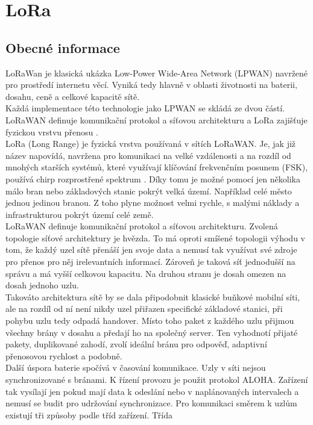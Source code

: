 \documentclass{ctuthesis}
\begin{document}
\section{LoRa}
\subsection{Obecné informace}
LoRaWan je klasická ukázka Low-Power Wide-Area Network (LPWAN) navržené pro
prostředí internetu věcí. Vyniká tedy hlavně v oblasti životnosti na baterii, dosahu, ceně a
celkové kapacitě sítě. \\
Každá implementace této technologie jako LPWAN se skládá ze dvou částí. LoRaWAN
definuje komunikační protokol a síťovou architekturu a LoRa zajišťuje fyzickou vrstvu přenosu
\cite{loraalliance}.\\
LoRa (Long Range) je fyzická vrstva používaná v sítích LoRaWAN. Je, jak již název napovídá,
navržena pro komunikaci na velké vzdálenosti a na rozdíl od mnohých starších systémů, které
využívají klíčování frekvenčním posunem (FSK), používá chirp rozprostřené spektrum \cite{loraalliance2}.
Díky tomu je možné pomocí jen několika málo bran nebo základových stanic pokrýt velká
území. Například celé město jednou jedinou branou. Z toho plyne možnost velmi rychle,
s malými náklady a infrastrukturou pokrýt území celé země.\\
LoRaWAN definuje komunikační protokol a síťovou architekturu. Zvolená topologie síťové
architektury je hvězda. To má oproti smíšené topologii výhodu v tom, že každý uzel sítě přenáší
jen svoje data a nemusí tak využívat své zdroje pro přenos pro něj irelevantních informací.
Zároveň je taková síť jednodušší na správu a má vyšší celkovou kapacitu. Na druhou stranu je
dosah omezen na dosah jednoho uzlu.\\
Takováto architektura sítě by se dala připodobnit klasické buňkové mobilní síti, ale na rozdíl
od ní není nikdy uzel přiřazen specifické základové stanici, při pohybu uzlu tedy odpadá
handover. Místo toho paket z každého uzlu přijmou všechny brány v dosahu a předají ho na
společný server. Ten vyhodnotí přijaté pakety, duplikované zahodí, zvolí ideální bránu pro
odpověď, adaptivní přenosovou rychlost a podobně.\\
Další úspora baterie spočívá v časování komunikace. Uzly v síti nejsou synchronizované
s bránami. K řízení provozu je použit protokol ALOHA. Zařízení tak vysílají jen pokud mají
data k odeslání nebo v naplánovaných intervalech a nemusí se budit pro udržování
synchronizace. Pro komunikaci směrem k uzlům existují tři způsoby podle tříd zařízení. Třída
\end{document}
